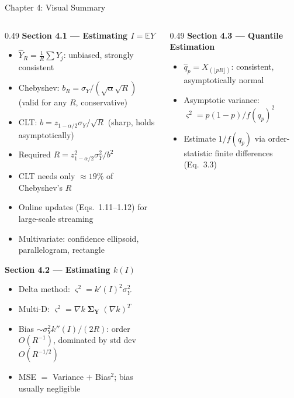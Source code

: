 \documentclass[aspectratio=169,10pt]{beamer}
\begin{document}
\begin{frame}{Chapter 4: Visual Summary}
  \begin{columns}[T]
    \begin{column}{0.49\textwidth}
      \textbf{Section 4.1 --- Estimating $I = \mathbb{E}Y$}
      \begin{itemize}\small
        \item $\hat{Y}_R = \frac{1}{R}\sum Y_j$: unbiased, strongly consistent
        \item Chebyshev: $b_R = \sigma_Y/(\sqrt{\alpha}\sqrt{R})$
          (valid for any $R$, conservative)
        \item CLT: $b = z_{1-\alpha/2}\sigma_Y/\sqrt{R}$
          (sharp, holds asymptotically)
        \item Required $R = z_{1-\alpha/2}^2 \sigma_Y^2/b^2$
        \item CLT needs only $\approx 19\%$ of Chebyshev's $R$
        \item Online updates (Eqs.\ 1.11--1.12) for large-scale streaming
        \item Multivariate: confidence ellipsoid, parallelogram, rectangle
      \end{itemize}
      \medskip
      \textbf{Section 4.2 --- Estimating $k(I)$}
      \begin{itemize}\small
        \item Delta method: $\varsigma^2 = k'(I)^2\sigma_Y^2$
        \item Multi-D: $\varsigma^2 = \nabla k\;\boldsymbol{\Sigma}_{\mathbf{Y}}\;(\nabla k)^T$
        \item Bias $\sim \sigma_Y^2 k''(I)/(2R)$: order $O(R^{-1})$,
          dominated by std dev $O(R^{-1/2})$
        \item MSE $=$ Variance $+$ Bias$^2$; bias usually negligible
      \end{itemize}
    \end{column}
    \begin{column}{0.49\textwidth}
      \textbf{Section 4.3 --- Quantile Estimation}
      \begin{itemize}\small
        \item $\hat{q}_p = X_{(\lfloor pR\rfloor)}$: consistent, asymptotically normal
        \item Asymptotic variance: $\varsigma^2 = p(1-p)/f(q_p)^2$
        \item Estimate $1/f(q_p)$ via order-statistic finite differences (Eq.\ 3.3)

\end{itemize}
\end{column}
\end{columns}
\end{frame}
\end{document}
